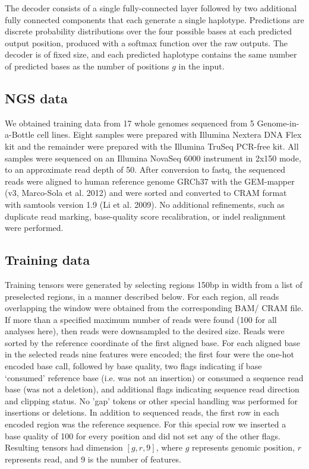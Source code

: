 \documentclass[]{article}
\begin{document}
The decoder consists of a single fully-connected layer followed by two additional fully connected components that each generate a single haplotype. Predictions are discrete probability distributions over the four possible bases at each predicted output position, produced with a softmax function over the raw outputs. The decoder is of fixed size, and each predicted haplotype contains the same number of predicted bases as the number of positions $g$ in the input. 


\subsection{NGS data}

We obtained training data from 17 whole genomes sequenced from 5 Genome-in-a-Bottle cell lines. Eight samples were prepared with Illumina Nextera DNA Flex kit and the remainder were prepared with the Illumina TruSeq PCR-free kit. All samples were sequenced on an Illumina NovaSeq 6000 instrument in 2x150 mode, to an approximate read depth of 50. After conversion to fastq, the sequenced reads were aligned to human reference genome GRCh37 with the GEM-mapper (v3, Marco-Sola et al. 2012) and were sorted and converted to CRAM format with samtools version 1.9 (Li et al. 2009). No additional refinements, such as duplicate read marking, base-quality score recalibration, or indel realignment were performed.

\subsection{Training data}

Training tensors were generated by selecting regions 150bp in width from a list of preselected regions, in a manner described below. For each region, all reads overlapping the window were obtained from the corresponding BAM/ CRAM file. If more than a specified maximum number of reads were found (100 for all analyses here), then reads were downsampled to the desired size.  Reads were sorted by the reference coordinate of the first aligned base. For each aligned base in the selected reads nine features were encoded; the first four were the one-hot encoded base call, followed by base quality, two flags indicating if base `consumed' reference base (i.e. was not an insertion) or consumed a sequence read base (was not a deletion), and additional flags indicating sequence read direction and clipping status.  No 'gap' tokens or other special handling was performed for insertions or deletions. In addition to sequenced reads, the first row in each encoded region was the reference sequence. For this special row we inserted a base quality of 100 for every position and did not set any of the other flags. Resulting tensors had dimension $[g, r, 9]$, where $g$ represents genomic position, $r$ represents read, and 9 is the number of features. 
\end{document}
